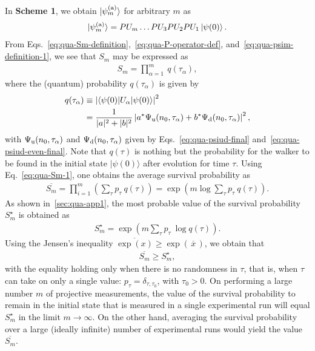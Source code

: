 \documentclass[12pt]{iopart}
\def\i{\ket{\psi (0)}}
\def\ket#1{\mathinner{|{#1}\rangle}}
\begin{document}
In \textbf{Scheme 1}, we obtain $|\psi_m^{(\rm a)}\rangle$ for arbitrary $m$ as
\begin{align}
        \ket{\psi_m^{({\rm a})}}=PU_m \dots PU_3PU_2PU_1\i.
\label{eq:qua-psim-definition-1}
\end{align}
From Eqs.~\eqref{eq:qua-Sm-definition},~\eqref{eq:qua-P-operator-def},
and~\eqref{eq:qua-psim-definition-1}, we see that
$S_m$ may be expressed as
\begin{align}
S_m = \prod_{\alpha=1}^{m} ~ q(\tau_\alpha), 
        \label{eq:qua-Sm-1}
\end{align}
where the (quantum) probability $q(\tau_\alpha)$ is given by
\begin{align}
q(\tau_\alpha) &\equiv \left|\langle\psi(0)|U_\alpha|\psi(0)\rangle\right|^{2}  \label{eq:qua-qrw-qtau-0} \\
          &= \frac{1}{|a|^2 + |b|^2}\left| a^{*} \Psi_{\rm
          u}(n_0,\tau_\alpha) + b^{*} \Psi_{\rm d}(n_0,\tau_\alpha) \right|^2,
        \label{eq:qua-qrw-qtau}
\end{align}
with $\Psi_{\rm u}(n_0,\tau_\alpha)$ and $\Psi_{\rm d}(n_0,\tau_\alpha)$ given by
Eqs.~\eqref{eq:qua-psiud-final} and~\eqref{eq:qua-psiud-even-final}.
Note that $q(\tau)$ is nothing but the probability for the walker to be found in the
initial state $|\psi(0)\rangle$ after evolution for time $\tau$.
Using Eq.~\eqref{eq:qua-Sm-1}, one obtains the average survival probability as
\begin{align}
\overline{S_m}=\prod_{i=1}^m \left( \sum_\tau p_\tau ~ q(\tau)\right) = \exp\left( m \log \sum_\tau p_\tau ~ q(\tau) \right).
        \label{eq:qua-Sm-avg-qrw}
\end{align}
As shown in~\ref{sec:qua-app1}, the most probable value of the 
survival probability $S_m^\star$ is obtained as
\begin{align}
S_m^\star=\exp\left( m \sum_\tau p_\tau ~ \log q(\tau) \right).
        \label{eq:qua-Sm-typical-qrw}
\end{align}
Using the Jensen's inequality
$\overline{\exp
(x)} \ge \exp(\,\overline{x}\,)$, we obtain that
\begin{align}
        \overline{S_m} \ge S_m^\star,
\end{align}
with the equality holding only when there is no randomness in $\tau$,
that is, when $\tau$ can take on only a single value:
$p_\tau=\delta_{\tau,\tau_0}$, with $\tau_0 >0$. On performing a large number $m$ of projective
measurements, the value of the survival probability to remain in the initial state that is measured in a single
experimental run will equal $S_m^\star$ in the limit $m\to \infty$. On
the other hand, averaging the survival probability over a large (ideally
infinite) number of experimental runs would yield the value $\overline{S_m}$.
\end{document}
